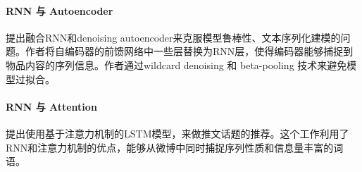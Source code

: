 \paragraph{RNN 与 Autoencoder}
\cite{wang2016collaborative}提出融合RNN和denoising autoencoder来克服模型鲁棒性、文本序列化建模的问题。作者将自编码器的前馈网络中一些层替换为RNN层，使得编码器能够捕捉到物品内容的序列信息。作者通过wildcard denoising 和 beta-pooling 技术来避免模型过拟合。
\paragraph{RNN 与 Attention}
\cite{li2016hashtag}提出使用基于注意力机制的LSTM模型，来做推文话题的推荐。这个工作利用了RNN和注意力机制的优点，能够从微博中同时捕捉序列性质和信息量丰富的词语。
